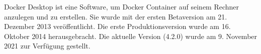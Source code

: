 
Docker Desktop ist eine Software, um Docker Container auf seinem Rechner anzulegen und zu erstellen. Sie wurde mit der ersten Betaversion am 21. Dezember 2013 veröffentlicht. Die erste Produktionsversion wurde am 16. Oktober 2014 herausgebracht. Die aktuelle Version (4.2.0) wurde am 9. November 2021 zur Verfügung gestellt. \cite{DockerWiki}
